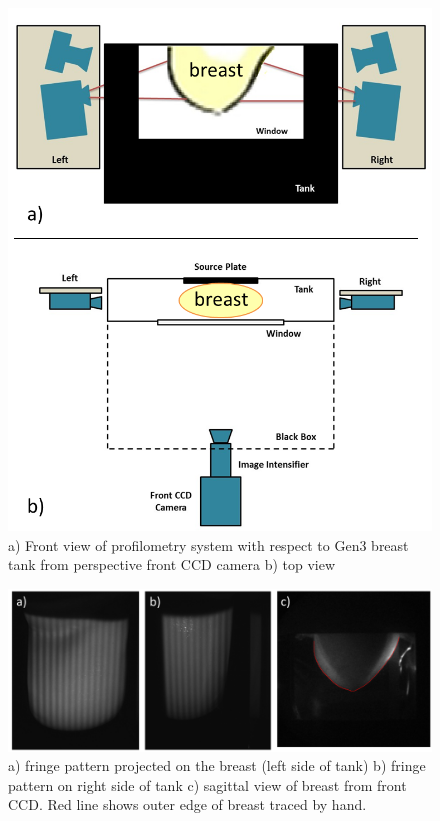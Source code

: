 \begin{figure}[ht]
\begin{center}
\includegraphics[width=12cm]{./figures/4_Gen3/proftank.png}
\caption{a) Front view of profilometry system with respect to Gen3 breast tank from perspective front CCD camera b) top view}
\label{fig:proftank}
\end{center}
\end{figure}
\begin{figure}[ht]
\begin{center}
\includegraphics[width=12cm]{./figures/4_Gen3/profdata.png}
\caption{ a) fringe pattern projected on the breast (left side of tank) b) fringe pattern on right side of tank c) sagittal view of breast from front CCD. Red line shows outer edge of breast traced by hand.}
\label{fig:profdata}
\end{center}
\end{figure}
